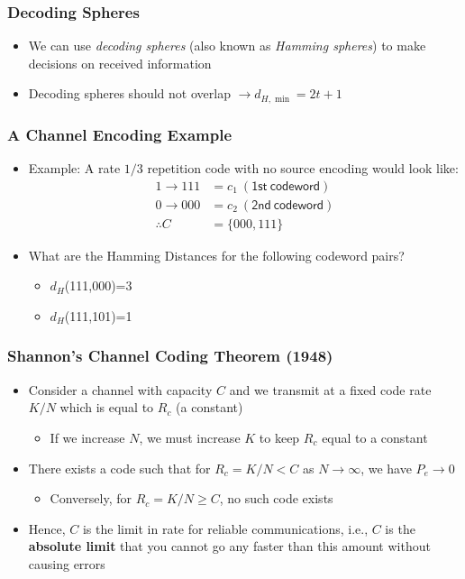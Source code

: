\documentclass[10pt]{beamer}
\begin{document}
\frame
{
  \frametitle{Decoding Spheres}

  \begin{itemize}
    \item We can use {\it decoding spheres} (also known as {\it Hamming spheres}) to make decisions on received information
    \item Decoding spheres should not overlap $\rightarrow{d_{H,\min}}=2t+1$
  \end{itemize}

}
\frame
{
  \frametitle{A Channel Encoding Example}

    \begin{itemize}
        \item Example: A rate $1/3$ repetition code with no source encoding would look like:
        \begin{equation}
        \begin{split}
            1\rightarrow{111}&={c_{1}}~(\mathsf{1st~codeword})\\
            0\rightarrow{000}&={c_{2}}~(\mathsf{2nd~codeword})\\
            \therefore{C}&=\{000,111\}
        \end{split}
        \end{equation}
       \item What are the Hamming Distances for the following codeword pairs?
            \begin{itemize}
            \item $d_{H}$(111,000)=3
            \item $d_{H}$(111,101)=1
            \end{itemize}
    \end{itemize}

}
\frame
{
  \frametitle{Shannon's Channel Coding Theorem (1948)}

  \begin{itemize}
  \item Consider a channel with capacity $C$ and we transmit at a fixed code rate $K/N$ which is equal to $R_c$ (a constant)
  \begin{itemize}
    \item If we increase $N$, we must increase $K$ to keep $R_c$ equal to a constant
  \end{itemize}
  \item There exists a code such that for $R_c=K/N<C$ as $N\rightarrow\infty$, we have $P_e\rightarrow{0}$
  \begin{itemize}
    \item Conversely, for $R_c=K/N \geq C$, no such code exists
  \end{itemize}
  \item Hence, $C$ is the limit in rate for reliable communications, i.e., $C$ is the {\bf absolute limit} that you cannot go any faster than this amount without causing errors
  \end{itemize}
}
\end{document}
